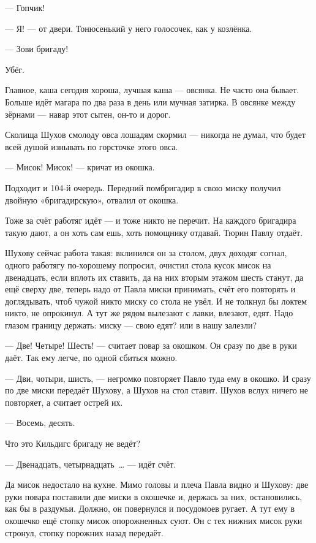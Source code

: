--- Гопчик!

--- Я! --- от двери. Тонюсенький у него голосочек, как у козлёнка.

--- Зови бригаду!

Убёг.

Главное, каша сегодня хороша, лучшая каша --- овсянка. Не часто она бывает. Больше идёт магара по два раза в день или мучная затирка. В овсянке между зёрнами --- навар этот сытен, он-то и дорог.

Сколища Шухов смолоду овса лошадям скормил --- никогда не думал, что будет всей душой изнывать по горсточке этого овса.

--- Мисок! Мисок! --- кричат из окошка.

Подходит и 104-й очередь. Передний помбригадир в свою миску получил двойную «бригадирскую», отвалил от окошка.

Тоже за счёт работяг идёт --- и тоже никто не перечит. На каждого бригадира такую дают, а он хоть сам ешь, хоть помощнику отдавай. Тюрин Павлу отдаёт.

Шухову сейчас работа такая: вклинился он за столом, двух доходяг согнал, одного работягу по-хорошему попросил, очистил стола кусок мисок на двенадцать, если вплоть их ставить, да на них вторым этажом шесть станут, да ещё сверху две, теперь надо от Павла миски принимать, счёт его повторять и доглядывать, чтоб чужой никто миску со стола не увёл. И не толкнул бы локтем никто, не опрокинул. А тут же рядом вылезают с лавки, влезают, едят. Надо глазом границу держать: миску --- свою едят? или в нашу залезли?

--- Две! Четыре! Шесть! --- считает повар за окошком. Он сразу по две в руки даёт. Так ему легче, по одной сбиться можно.

--- Дви, чотыри, шисть, --- негромко повторяет Павло туда ему в окошко. И сразу по две миски передаёт Шухову, а Шухов на стол ставит. Шухов вслух ничего не повторяет, а считает острей их.

--- Восемь, десять.

Что это Кильдигс бригаду не ведёт?

--- Двенадцать, четырнадцать~\dots{} --- идёт счёт.

Да мисок недостало на кухне. Мимо головы и плеча Павла видно и Шухову: две руки повара поставили две миски в окошечке и, держась за них, остановились, как бы в раздумьи. Должно, он повернулся и посудомоев ругает. А тут ему в окошечко ещё стопку мисок опорожненных суют. Он с тех нижних мисок руки стронул, стопку порожних назад передаёт.

